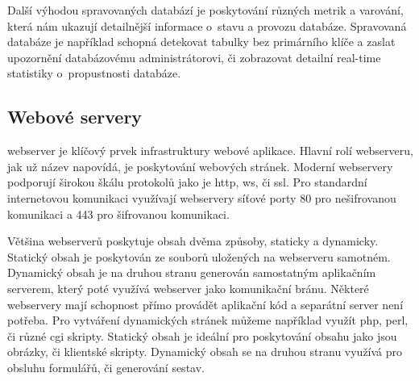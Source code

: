 Další výhodou spravovaných databází je poskytování různých metrik a varování, která nám ukazují detailnější informace o~stavu a provozu databáze. Spravovaná databáze je například schopná detekovat tabulky bez primárního klíče a zaslat upozornění databázovému administrátorovi, či zobrazovat detailní \gls{real-time} statistiky o~propustnosti databáze.

\subsection{Webové servery}

\acrfull{webserver}\cite{webserver} je klíčový prvek infrastruktury webové aplikace. Hlavní rolí \acrshort{webserver}u, jak už název napovídá, je poskytování webových stránek. Moderní \acrshort{webserver}y podporují širokou škálu protokolů jako je \acrfull{http}, \acrfull{ws}, či \acrfull{ssl}. Pro standardní internetovou komunikaci využívají \acrshort{webserver}y síťové porty 80 pro nešifrovanou komunikaci a 443 pro šifrovanou komunikaci. 

Většina \acrshort{webserver}ů poskytuje obsah dvěma způsoby, staticky a dynamicky. Statický obsah je poskytován ze souborů uložených na \acrshort{webserver}u samotném. Dynamický obsah je na druhou stranu generován samostatným aplikačním serverem, který poté využívá \acrshort{webserver} jako komunikační bránu. Některé \acrshort{webserver}y mají schopnost přímo provádět aplikační kód a separátní server není potřeba. Pro vytváření dynamických stránek můžeme například využít \acrshort{php}, \Gls{perl}, či různé \Gls{cgi} skripty. Statický obsah je ideální pro poskytování obsahu jako jsou obrázky, či klientské skripty. Dynamický obsah se na druhou stranu využívá pro obsluhu formulářů, či generování sestav.
